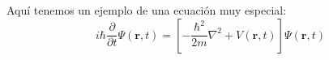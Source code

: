 \documentclass{article}
\begin{document}
Aquí tenemos un ejemplo de una ecuación muy especial:
\begin{equation}
i\hbar\frac{\partial}{\partial t}\Psi(\mathbf{r},t) = \left[-\frac{\hbar^2}{2m}\nabla^2 + V(\mathbf{r},t)\right]\Psi(\mathbf{r},t)
\label{eq:schrodinger}
\end{equation}
\end{document}
